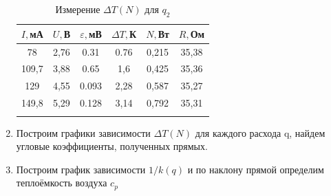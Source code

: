 \documentclass[a4paper, 12pt]{article}%
\begin{document}
\begin{enumerate}
\begin{longtable}{|c|c|c|c|c|c|}
	\hline
	$I, $мА & $U, $В &$\varepsilon, $мВ & $ \Delta T, $К & $N, $Вт &  $R, $Ом 
	\\
	\hline
	78 & 2,76 & 0.31 & 0.76 & 0,215 & 35,38 
	\\
	\hline
	109,7 & 3,88 & 0.65 & 1,6 & 0,425 & 35,36
	\\
	\hline
	129 & 4,55 & 0.093 & 2,28 & 0,587 & 35,27
	\\
	\hline
	149,8 & 5,29 & 0.128 & 3,14 & 0,792 & 35,31
	\\
	\hline
	\caption{Измерение $\Delta T (N)$ для $ q_2$}
\end{longtable}

	\item Построим графики зависимости $\Delta T (N)$ для каждого расхода q, найдем угловые коэффициенты, полученных прямых.

	\begin{figure}[h]
	\end{figure}
	
\newpage
	\item Построим график зависимости $1/k(q)$ и по наклону прямой определим теплоёмкость воздуха $c_p$
	

\end{enumerate}
\end{document}
